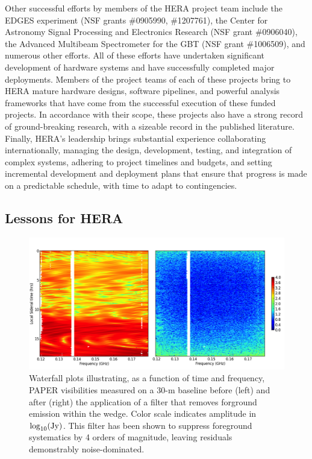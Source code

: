 \documentclass[preprint]{aastex}
\begin{document}
Other successful efforts by members of the HERA project team include the EDGES experiment (NSF grants \#0905990, \#1207761),
the Center for Astronomy Signal Processing and Electronics Research (NSF grant \#0906040), the Advanced Multibeam
Spectrometer for the GBT (NSF grant \#1006509), and numerous other efforts.
All of these efforts have undertaken significant development of hardware systems and have 
successfully completed major deployments.  Members of the project teams of each of these projects
bring to HERA mature hardware designs, software pipelines, and powerful analysis frameworks that
have come from the successful execution of these funded projects.  
In accordance with their scope,
these projects also have a strong record of ground-breaking research, with a sizeable record in the published literature.
Finally, HERA's leadership brings substantial experience
collaborating internationally, managing the design, development, testing, and integration of complex systems,
adhering to project timelines and budgets, and setting incremental development and deployment plans that
ensure that progress is made on a predictable schedule, with time to adapt to contingencies.



\subsection{Lessons for HERA}


\begin{figure}[t]\centering
\includegraphics[width=6in]{plots/waterfall_filtered.png}
\caption{\small 
Waterfall plots illustrating, as a function of time and frequency, PAPER visibilities
measured on a 30-m baseline before (left) and after (right) the application of a 
filter that removes forground emission within the wedge.  Color scale indicates amplitude in $\log_{10}({\rm Jy})$.
This filter has been shown to suppress
foreground systematics by 4 orders of magnitude, leaving residuals demonstrably noise-dominated.
}\label{fig:waterfall} \end{figure}
\end{document}
